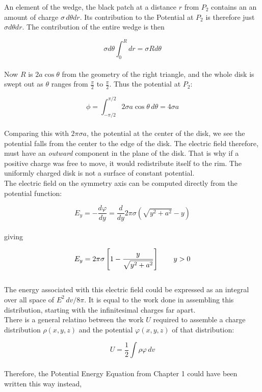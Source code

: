 \documentclass[svgnames]{article}
\begin{document}
An element of the wedge, the black patch at a distance $r$ from $P_2$ contains an an amount of charge $\sigma \, d\theta dr$. Its contribution to the Potential at $P_2$ is therefore just $\sigma d\theta dr$. The contribution of the entire wedge is then 

\[ \sigma d\theta \int_0^R dr = \sigma R d\theta \]\\

Now $R$ is $2a\cos\theta$ from the geometry of the right triangle, and the whole disk is swept out as $\theta$ ranges from $\frac{\pi}{2}$ to $\frac{\pi}{2}$. Thus the potential at $P_2$: 

\[ \phi = \int_{-\pi / 2}^{\pi / 2} 2\sigma a \cos \theta \, d\theta = 4\sigma a \] \\

Comparing this with $2\pi \sigma a$, the potential at the center of the disk, we see the potential falls from the center to the edge of the disk. The electric field therefore, must have an \textit{outward} component in the plane of the disk. That is why if a positive charge was free to move, it would redistribute itself to the rim. The uniformly charged disk is not a surface of constant potential. \\

The electric field on the symmetry axis can be computed directly from the potential function: 

\[ E_y = -\frac{d\varphi}{dy} = \frac{d}{dy} 2\pi \sigma (\sqrt{y^2 + a^2} - y) \] \\

giving 

\[ E_y = 2\pi \sigma \left[1 - \frac{y}{\sqrt{y^2+a^2}} \right] \hspace{20px} y > 0 \]\\

The energy associated with this electric field could be expressed as an integral over all space of $E^2 \, dv / 8\pi$. It is equal to the work done in assembling this distribution, starting with the infinitesimal charges far apart. \\ 

There is a general relatino between the work $U$ required to assemble a charge distribution $\rho (x, y, z)$ and the potential $\varphi(x, y, z)$ of that distribution: 

\[ U = \frac{1}{2} \int \rho \varphi \, dv \] \\ 

Therefore, the Potential Energy Equation from Chapter 1 could have been written this way instead, 
\end{document}
